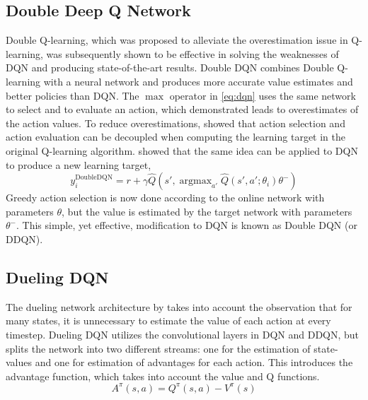 \documentclass{article}
\DeclareMathOperator*{\argmax}{argmax}
\begin{document}
\subsection{Double Deep Q Network}
Double Q-learning, which was proposed to alleviate the overestimation issue in
Q-learning, was subsequently shown to be effective in solving the weaknesses of
DQN and producing state-of-the-art results.  Double DQN combines Double
Q-learning with a neural network and produces more accurate value estimates and
better policies than DQN.  The $\max$ operator in \eqref{eq:dqn} uses the same
network to select and to evaluate an action, which \cite{van2016deep}
demonstrated leads to overestimates of the action values. To reduce
overestimations, \cite{hasselt2010double} showed that action selection and
action evaluation can be decoupled when computing the learning target in the
original Q-learning algorithm. \cite{van2016deep} showed that the same idea can
be applied to DQN to produce a new learning target,
\begin{equation}
    y_i^{\text{DoubleDQN}} = r + \gamma \hat{Q}(s', \argmax_{a'}
    \hat{Q}(s',a';\theta_i) \theta^-)
\end{equation}
Greedy action selection is now done according to the online network with
parameters $\theta$, but the value is estimated by the target network with
parameters $\theta^-$.  This simple, yet effective, modification to DQN is known
as Double DQN (or DDQN). 



\subsection{Dueling DQN}
The dueling network architecture by \cite{wang2016dueling} takes into account
the observation that for many states, it is unnecessary to estimate the value of
each action at every timestep. Dueling DQN utilizes the convolutional layers in
DQN and DDQN, but splits the network into two different streams: one for the
estimation of state-values and one for estimation of advantages for each action.
This introduces the advantage function, which takes into account the value and Q
functions.
\begin{equation}
    A^{\pi}(s, a) = Q^{\pi}(s,a) - V^{\pi}(s)
\end{equation}
\end{document}

